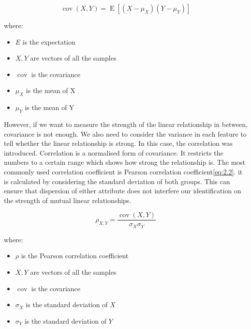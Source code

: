 \documentclass[11pt]{article} %
\theoremstyle{plain}
\theoremstyle{definition}
\begin{document}
{
  \begin{equation}
    \label{eq:2.1}
    \tag{2.1}
    {\operatorname {cov} (X,Y)=\operatorname {E} [(X-\mu _{X})(Y-\mu _{Y})]}
  \end{equation}

  \footnotesize
  where:
  \begin{itemize}[label=-, leftmargin=4em, itemsep=0.1em]
    \item ${E}$ is the expectation
    \item ${X, Y}$ are vectors of all the samples
    \item $\operatorname {cov}$ is the covariance
    \item ${\mu}_{X}$ is the mean of X
    \item ${\mu}_{Y}$ is the mean of Y
  \end{itemize}
}

However, if we want to measure the strength of the linear relationship in between, covariance is not enough. We also need to consider the variance in each feature to tell whether the linear relationship is strong. In this case, the correlation was introduced. Correlation is a normalised form of covariance. It restricts the numbers to a certain range which shows how strong the relationship is. The most commonly used correlation coefficient is Pearson correlation coefficient\eqref{eq:2.2}. it is calculated by considering the standard deviation of both groups. This can ensure that dispersion of either attribute does not interfere our identification on the strength of mutual linear relationships\cite{wiki/pcc:2018}.

{
  \begin{equation}
    \label{eq:2.2}
    \tag{2.2}
    \rho _{X,Y}={\frac {\operatorname {cov} (X,Y)}{\sigma _{X}\sigma _{Y}}}
  \end{equation}

  \footnotesize
  where:
  \begin{itemize}[label=-, leftmargin=4em, itemsep=0.1em]
    \item ${\rho}$ is the Pearson correlation coefficient
    \item ${X, Y}$ are vectors of all the samples
    \item $\operatorname {cov}$ is the covariance
    \item ${\sigma}_{X}$ is the standard deviation of ${X}$
    \item ${\sigma}_{Y}$ is the standard deviation of ${Y}$
  \end{itemize}
}
\end{document}
